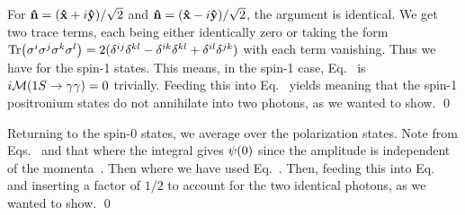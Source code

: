 \documentclass[11pt]{article}
\begin{document}
{	For $\vb{\hat{n}} = (\vb{\hat{x}} + i \vb{\hat{y}}) / \sqrt{2}$ and $\vb{\hat{n}} = (\vb{\hat{x}} - i \vb{\hat{y}}) / \sqrt{2}$, the argument is identical.  We get two trace terms, each being either identically zero or taking the form $\Tr(\sigma^i \sigma^j \sigma^k \sigma^l) = 2 (\delta^{i j} \delta^{k l} - \delta^{i k} \delta^{k l} + \delta^{i l} \delta^{j k})$ with each term vanishing.  Thus we have
	for the spin-1 states.  This means, in the spin-1 case, Eq.~ is $i \mathcal{M}(1S \to \gamma \gamma) = 0$ trivially.  Feeding this into Eq.~ yields
	meaning that the spin-1 positronium states do not annihilate into two photons, as we wanted to show. \qed
	
	Returning to the spin-0 states, we average over the polarization states.  Note from Eqs.~ and  that
	where the integral gives $\psi(0)$ since the amplitude is independent of the momenta~\cite[p.~149]{Peskin}.  Then
	where we have used Eq.~.  Then, feeding this into Eq.~ and inserting a factor of $1/2$ to account for the two identical photons,
	as we wanted to show. \qed
}


\makebib
\end{document}
